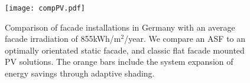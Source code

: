 


\begin{figure}[H]
\begin{center}
\texttt{[image: compPV.pdf]}
\caption{Comparison of facade installations in Germany with an average facade irradiation of 855kWh/m$^2$/year.
We compare an ASF to an optimally orientated static facade, and classic flat facade mounted PV solutions. The orange bars include the system expansion of energy savings through adaptive shading.}
\label{fig:compPV}
\end{center}
\end{figure}

